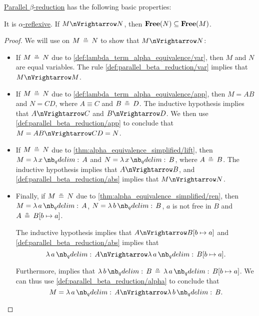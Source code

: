 \begin{proposition}\label{thm:def:parallel_beta_reduction}
  \hyperref[def:parallel_beta_reduction]{Parallel \( \beta \)-reduction} has the following basic properties:
  \begin{thmenum}
     It is \hyperref[def:alpha_reflexive_closure]{\( \alpha \)-reflexive}.
     If \( M \pred N \), then \( \op*{Free}(N) \subseteq \op*{Free}(M) \).
  \end{thmenum}
\end{proposition}
\begin{proof}
   We will use  on \( M \aequiv N \) to show that \( M \pred N \):
  \begin{itemize}
    \item If \( M \aequiv N \) due to \ref{def:lambda_term_alpha_equivalence/var}, then \( M \) and \( N \) are equal variables. The rule \ref{def:parallel_beta_reduction/var} implies that \( M \pred M \).

    \item If \( M \aequiv N \) due to \ref{def:lambda_term_alpha_equivalence/app}, then \( M = AB \) and \( N = CD \), where \( A \equiv C \) and \( B \aequiv D \). The inductive hypothesis implies that \( A \pred C \) and \( B \pred D \). We then use \ref{def:parallel_beta_reduction/app} to conclude that \( M = AB \pred CD = N \).

    \item If \( M \aequiv N \) due to \ref{thm:alpha_equivalence_simplified/lift}, then \( M = \qabs x A \) and \( N = \qabs x B \), where \( A \aequiv B \). The inductive hypothesis implies that \( A \pred B \), and \ref{def:parallel_beta_reduction/abs} implies that \( M \pred N \).

    \item Finally, if \( M \aequiv N \) due to \ref{thm:alpha_equivalence_simplified/ren}, then \( M = \qabs a A \), \( N = \qabs b B \), \( a \) is not free in \( B \) and \( A \aequiv B[b \mapsto a] \).

    The inductive hypothesis implies that \( A \pred B[b \mapsto a] \) and \ref{def:parallel_beta_reduction/abs} implies that
    \begin{equation*}
      \qabs a A \pred \qabs a B[b \mapsto a].
    \end{equation*}

    Furthermore,  implies that \( \qabs b B \aequiv \qabs a B[b \mapsto a] \). We can thus use \ref{def:parallel_beta_reduction/alpha} to conclude that
    \begin{equation*}
      M = \qabs a A \pred \qabs b B.
    \end{equation*}
  \end{itemize}


\end{proof}
